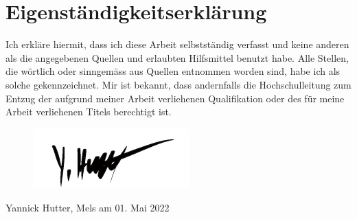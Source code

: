 \section{Eigenständigkeitserklärung}
Ich erkläre hiermit, dass ich diese Arbeit selbstständig verfasst und keine anderen als die angegebenen Quellen und erlaubten Hilfsmittel benutzt habe. Alle Stellen, die wörtlich oder sinngemäss aus Quellen entnommen worden sind, habe ich als solche gekennzeichnet. Mir ist bekannt, dass andernfalls die Hochschulleitung zum Entzug der aufgrund meiner Arbeit verliehenen Qualifikation oder des für meine Arbeit verliehenen Titels berechtigt ist.

\begin{figure}[ht]
	\includegraphics[width=6cm]{images/signature.png}
\end{figure}
Yannick Hutter, Mels am 01. Mai 2022